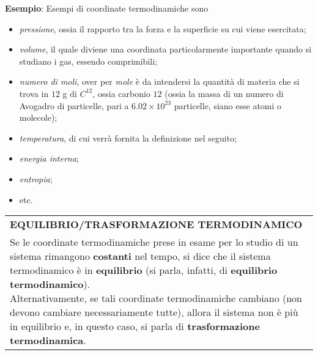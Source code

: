 \documentclass[a4paper]{extarticle}
\renewcommand\arraystretch{}
\begin{document}
\vspace{1em}
\noindent
\textbf{Esempio}: Esempi di coordinate termodinamiche sono
\begin{itemize}
  \item \emph{pressione}, ossia il rapporto tra la forza e la superficie su cui viene esercitata;
  \item \emph{volume}, il quale diviene una coordinata particolarmente importante quando si studiano i gas, essendo comprimibili;
  \item \emph{numero di moli}, over per \emph{mole} è da intendersi la quantità di materia che si trova in $12$ g di $C^{12}$, ossia carbonio $12$ (ossia la massa di un numero di Avogadro di particelle, pari a $6.02 \times 10^{23}$ particelle, siano esse atomi o molecole);
  \item \emph{temperatura}, di cui verrà fornita la definizione nel seguito;
  \item \emph{energia interna};
  \item \emph{entropia};
  \item etc.
\end{itemize}

\vspace{1em}
\setlength{\tabcolsep}{14pt}
\renewcommand{\arraystretch}{2}
\noindent
\begin{tabularx}{\textwidth}{@{}|P|@{}}
    \hline
    {\textbf{EQUILIBRIO/TRASFORMAZIONE TERMODINAMICO}}\\
    \parbox{\linewidth}{Se le coordinate termodinamiche prese in esame per lo studio di un sistema rimangono \textbf{costanti} nel tempo, si dice che il sistema termodinamico è in \textbf{equilibrio} (si parla, infatti, di \textbf{equilibrio termodinamico}).\\
    Alternativamente, se tali coordinate termodinamiche cambiano (non devono cambiare necessariamente tutte), allora il sistema non è più in equilibrio e, in questo caso, si parla di \textbf{trasformazione termodinamica}.\vspace{3mm}}\\
    \hline
\end{tabularx}
\end{document}
